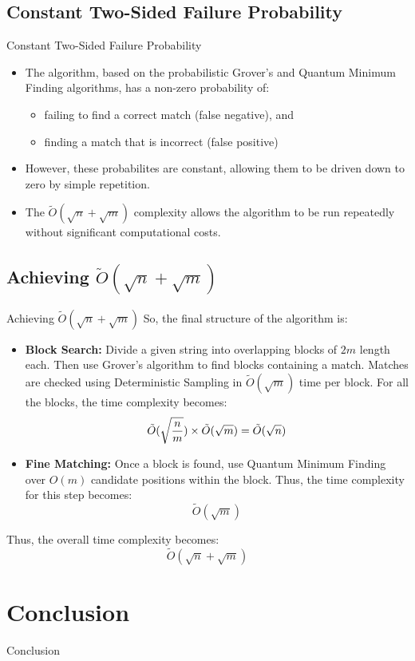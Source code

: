 \documentclass{beamer}
\begin{document}
\subsection{Constant Two-Sided Failure Probability}
\begin{frame}{Constant Two-Sided Failure Probability}
	\begin{itemize}
		\item The algorithm, based on the probabilistic Grover's and Quantum Minimum Finding algorithms, has a non-zero probability of:
		\begin{itemize}
			\item failing to find a correct match (false negative), and
			\item finding a match that is incorrect (false positive)
		\end{itemize}

		\item However, these probabilites are constant, allowing them to be driven down to zero by simple repetition.
		\item The $\tilde{O} (\sqrt{n} + \sqrt{m})$ complexity allows the algorithm to be run repeatedly without significant computational costs.
	\end{itemize}
\end{frame}

\subsection{Achieving \texorpdfstring{$\tilde{O}(\sqrt{n} + \sqrt{m})$}{O(sqrt(n)+sqrt(m))}}
\begin{frame}{Achieving \texorpdfstring{$\tilde{O}(\sqrt{n} + \sqrt{m})$}{O(sqrt(n)+sqrt(m))}}
	So, the final structure of the algorithm is:
	\begin{itemize}
		\item \textbf{Block Search: }Divide a given string into overlapping blocks of $2m$ length each. Then use Grover's algorithm to find blocks containing a match. Matches are checked using Deterministic Sampling in $\tilde{O}(\sqrt{m})$ time per block. For all the blocks, the time complexity becomes:
		\[
			\tilde{O} ( \sqrt{n \over m} ) \times \tilde{O}(\sqrt{m}) = \tilde{O}(\sqrt{n})
		\]
		\item \textbf{Fine Matching: }Once a block is found, use Quantum Minimum Finding over $O(m)$ candidate positions within the block. Thus, the time complexity for this step becomes:
		\[
		\tilde{O}(\sqrt{m})
		\]
	\end{itemize}
	Thus, the overall time complexity becomes:
	\[
	\tilde{O}(\sqrt{n}+\sqrt{m})
	\]
	
\end{frame}


\section{Conclusion}
\begin{frame}{Conclusion}
\end{frame}
\end{document}
